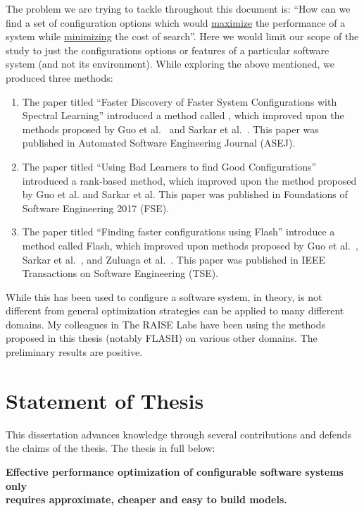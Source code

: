 The problem we are trying to tackle throughout this document is: ``How can we find a set of configuration options which would \underline{maximize} the performance of a system while \underline{minimizing} the cost of search''. Here we would limit our scope of the study to just the configurations options or features of a particular software system (and not its environment). While exploring the above mentioned, we produced three methods:
\begin{enumerate}
    \item The paper titled ``Faster Discovery of Faster System Configurations with Spectral Learning'' introduced a method called \what, which improved upon the methods proposed by Guo et al.~\cite{guo2013variability} and Sarkar et al.~\cite{sarkar2015cost}. This paper was published in Automated Software Engineering Journal (ASEJ). 
    
    \item The paper titled ``Using Bad Learners to find Good Configurations'' introduced a rank-based method, which improved upon the method proposed by Guo et al. and Sarkar et al. This paper was published in Foundations of Software Engineering 2017 (FSE).
    
    \item The paper titled ``Finding faster configurations using Flash'' introduce a method called Flash, which improved upon methods proposed by Guo et al.~\cite{guo2013variability}, Sarkar et al.~\cite{sarkar2015cost}, and Zuluaga et al.~\cite{zuluaga2016varepsilon}. This paper was published in IEEE Transactions on Software Engineering (TSE).
\end{enumerate}

While this has been used to configure a software system, in theory, is not different from general optimization strategies can be applied to many different domains. My colleagues in The RAISE Labs have been using the methods proposed in this thesis (notably FLASH) on various other domains. The preliminary results are positive.

\section{Statement of Thesis}
This dissertation advances knowledge through several contributions and defends the claims of the thesis. The thesis in full
below:
\begin{center}
\begin{flushleft}
    \hspace{2cm}\textbf{Effective performance optimization  of  configurable software systems only }\\
    \hspace{2cm}\textbf{requires approximate, cheaper and easy to build models.}\\
\end{flushleft}
\end{center}

